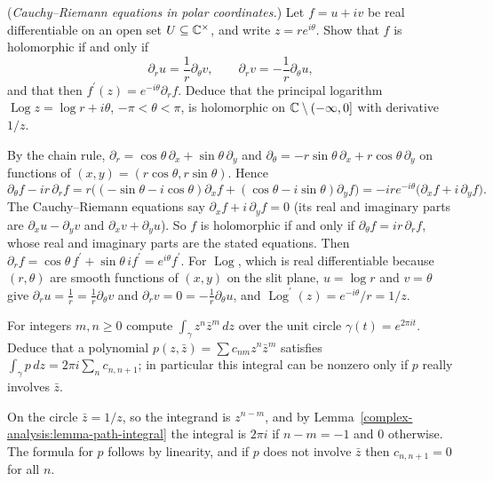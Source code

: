 \begin{exercise}\label{complex-analysis:exercise-polar-cauchy-riemann}
(\emph{Cauchy--Riemann equations in polar coordinates.}) Let $f = u + iv$ be real differentiable on an open set $U \subseteq \mathbb{C}^\times$, and write $z = re^{i\theta}$. Show that $f$ is holomorphic if and
only if
\[
\partial_ru = \frac1r\partial_\theta v, \qquad \partial_rv = -\frac1r\partial_\theta u,
\]
and that then $f^{\prime}(z) = e^{-i\theta}\partial_rf$. Deduce that the principal logarithm $\operatorname{Log}z = \log r + i\theta$, $-\pi < \theta < \pi$, is holomorphic on $\mathbb{C} \setminus (-\infty, 0]$ with
derivative $1/z$.
\end{exercise}

\begin{solution}
By the chain rule, $\partial_r = \cos\theta\,\partial_x + \sin\theta\,\partial_y$ and $\partial_\theta = -r\sin\theta\,\partial_x + r\cos\theta\,\partial_y$ on functions of $(x, y) = (r\cos\theta, r\sin\theta)$. Hence
\[
\partial_\theta f - ir\,\partial_rf = r\bigl((-\sin\theta - i\cos\theta)\partial_xf + (\cos\theta - i\sin\theta)\partial_yf\bigr) = -ire^{-i\theta}\bigl(\partial_xf + i\,\partial_yf\bigr).
\]
The Cauchy--Riemann equations say $\partial_xf + i\,\partial_yf = 0$ (its real and imaginary parts are $\partial_xu - \partial_yv$ and $\partial_xv + \partial_yu$). So $f$ is holomorphic if and only if
$\partial_\theta f = ir\,\partial_rf$, whose real and imaginary parts are the stated equations. Then $\partial_rf = \cos\theta\,f^{\prime} + \sin\theta\,if^{\prime} = e^{i\theta}f^{\prime}$. For
$\operatorname{Log}$, which is real differentiable because $(r, \theta)$ are smooth functions of $(x, y)$ on the slit plane, $u = \log r$ and $v = \theta$ give $\partial_ru = \frac1r = \frac1r\partial_\theta v$ and
$\partial_rv = 0 = -\frac1r\partial_\theta u$, and $\operatorname{Log}^{\prime}(z) = e^{-i\theta}/r = 1/z$.
\end{solution}

\begin{exercise}\label{complex-analysis:exercise-circle-monomials}
For integers $m, n \geq 0$ compute $\int_\gamma z^n\bar z^m\,dz$ over the unit circle $\gamma(t) = e^{2\pi it}$. Deduce that a polynomial $p(z, \bar z) = \sum c_{nm}z^n\bar z^m$ satisfies
$\int_\gamma p\,dz = 2\pi i\sum_nc_{n,n+1}$; in particular this integral can be nonzero only if $p$ really involves $\bar z$.
\end{exercise}

\begin{solution}
On the circle $\bar z = 1/z$, so the integrand is $z^{n-m}$, and by Lemma~\ref{complex-analysis:lemma-path-integral} the integral is $2\pi i$ if $n - m = -1$ and $0$ otherwise. The formula for $p$ follows by
linearity, and if $p$ does not involve $\bar z$ then $c_{n,n+1} = 0$ for all $n$.
\end{solution}

